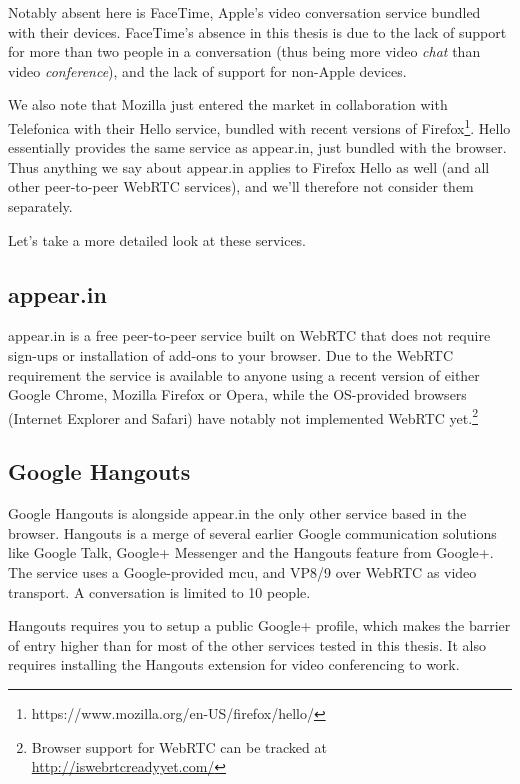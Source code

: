 Notably absent here is FaceTime, Apple's video conversation service bundled with their devices. FaceTime's absence in this thesis is due to the lack of support for more than two people in a conversation (thus being more video \emph{chat} than video \emph{conference}), and the lack of support for non-Apple devices.

We also note that Mozilla just entered the market in collaboration with Telefonica with their Hello service, bundled with recent versions of Firefox\footnote{https://www.mozilla.org/en-US/firefox/hello/}. Hello essentially provides the same service as appear.in, just bundled with the browser. Thus anything we say about appear.in applies to Firefox Hello as well (and all other peer-to-peer WebRTC services), and we'll therefore not consider them separately.

Let's take a more detailed look at these services.

\subsection{appear.in}

appear.in is a free peer-to-peer service built on WebRTC that does not require sign-ups or installation of add-ons to your browser. Due to the WebRTC requirement the service is available to anyone using a recent version of either Google Chrome, Mozilla Firefox or Opera, while the OS-provided browsers (Internet Explorer and Safari) have notably not implemented WebRTC yet.\footnote{Browser support for WebRTC can be tracked at \url{http://iswebrtcreadyyet.com/}}



\subsection{Google Hangouts}

Google Hangouts is alongside appear.in the only other service based in the browser. Hangouts is a merge of several earlier Google communication solutions like Google Talk, Google+ Messenger and the Hangouts feature from Google+. The service uses a Google-provided \gls{mcu}, and VP8/9 over WebRTC as video transport. A conversation is limited to 10 people.

Hangouts requires you to setup a public Google+ profile, which makes the barrier of entry higher than for most of the other services tested in this thesis. It also requires installing the Hangouts extension for video conferencing to work.


